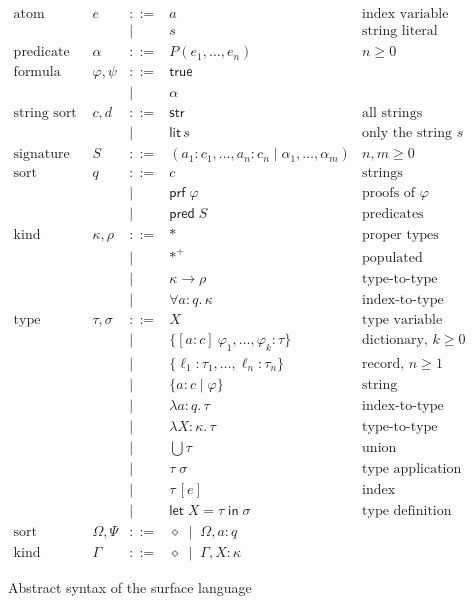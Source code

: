 \documentclass[11pt]{article}
\newcommand{\kw}[1]{\mathsf{#1}}
\newcommand{\str}{\kw{str}}
\newcommand{\lit}[1]{\kw{lit}\,#1}
\newcommand{\prf}[1]{\kw{prf}\;#1}
\newcommand{\pred}[1]{\kw{pred}\;#1}
\newcommand{\true}{\kw{true}}
\newcommand{\letin}[3]{\kw{let}\;#1 = #2\;\kw{in}\;#3}
\newcommand{\proper}{\ast}
\newcommand{\populated}{\ast^{+}}
\newcommand{\kall}[3]{\forall #1 : #2.\,#3}
\newcommand{\gdict}[4]{\{[#1 : #2]\ #3 : #4\}}
\newcommand{\refine}[3]{\{#1 : #2 \mid #3\}}
\newcommand{\iabs}[3]{\lambda #1 : #2.\,#3}
\newcommand{\tabs}[3]{\lambda #1 : #2.\,#3}
\newcommand{\union}[1]{\textstyle\bigcup #1}
\newcommand{\iapp}[2]{#1\,[#2]}
\newcommand{\emptyctx}{\diamond}
\theoremstyle{remark}
\begin{document}
\begin{figure}[!htbp]
\[
\begin{array}{llcll}
\text{atom} & e & ::= & a & \text{index variable} \\
  & & \mid & s & \text{string literal} \\[4pt]
\text{predicate application} & \alpha & ::= & P(e_1, \ldots, e_n) & n \geq 0 \\[4pt]
\text{formula} & \varphi, \psi & ::= & \true & \\
  & & \mid & \alpha & \\[4pt]
\text{string sort} & c, d & ::= & \str & \text{all strings} \\
  & & \mid & \lit{s} & \text{only the string } s \\[4pt]
\text{signature} & S & ::= & (a_1 : c_1, \ldots, a_n : c_n \mid \alpha_1, \ldots, \alpha_m)
  & n, m \geq 0 \\[4pt]
\text{sort} & q & ::= & c & \text{strings} \\
  & & \mid & \prf{\varphi} & \text{proofs of } \varphi \\
  & & \mid & \pred{S} & \text{predicates} \\[4pt]
\text{kind} & \kappa, \rho & ::= & \proper & \text{proper types} \\
  & & \mid & \populated & \text{populated proper types} \\
  & & \mid & \kappa \to \rho & \text{type-to-type operators} \\
  & & \mid & \kall{a}{q}{\kappa} & \text{index-to-type operators} \\[4pt]
\text{type} & \tau, \sigma & ::= & X & \text{type variable} \\
  & & \mid & \gdict{a}{c}{\varphi_1, \ldots, \varphi_k}{\tau} & \text{dictionary, } k \geq 0 \\
  & & \mid & \{\ell_1 : \tau_1, \ldots, \ell_n : \tau_n\} & \text{record, } n \geq 1 \\
  & & \mid & \refine{a}{c}{\varphi} & \text{string refinement} \\
  & & \mid & \iabs{a}{q}{\tau} & \text{index-to-type abstraction} \\
  & & \mid & \tabs{X}{\kappa}{\tau} & \text{type-to-type abstraction} \\
  & & \mid & \union{\tau} & \text{union} \\
  & & \mid & \tau\;\sigma & \text{type application} \\
  & & \mid & \iapp{\tau}{e} & \text{index application} \\
  & & \mid & \letin{X}{\tau}{\sigma} & \text{type definition} \\[4pt]
\text{sort context} & \Omega, \Psi & ::= & \emptyctx \;\mid\; \Omega, a : q & \\[2pt]
\text{kind context} & \Gamma & ::= & \emptyctx \;\mid\; \Gamma, X : \kappa &
\end{array}
\]
\caption{Abstract syntax of the surface language}
\label{fig:surface-syntax}
\end{figure}
\end{document}
